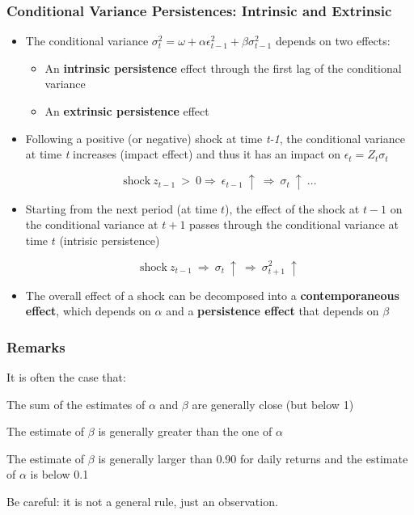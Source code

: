 \documentclass{beamer}
\newenvironment{wideitemize}{\itemize\addtolength{\itemsep}{10pt}}{\enditemize}
\newenvironment{wideenumerate}{\enumerate\addtolength{\itemsep}{10pt}}{\endenumerate}
\begin{document}
\begin{frame}
  \frametitle{Conditional Variance Persistences: Intrinsic and Extrinsic}
  \begin{itemize}
  \item The conditional variance $\sigma_t^2 = \omega + \alpha \epsilon^2_{t-1} + \beta \sigma^2_{t-1}$ depends on two effects:
    \begin{itemize}
    \item An \textbf{intrinsic persistence} effect through the first lag of the conditional variance
    \item An \textbf{extrinsic persistence} effect
    \end{itemize}
    
  \item Following a positive (or negative) shock at time \emph{t-1}, the conditional variance at time \emph{t} increases (impact effect) and thus it has an impact on $\epsilon_t = Z_t \sigma_t$

    \begin{equation*}
      \text{shock} \ z_{t-1} \ > \ 0 \Rightarrow \ \epsilon_{t-1} \ \uparrow \ \Rightarrow \ \sigma_t \ \uparrow \ \dots
    \end{equation*}

  \item Starting from the next period (at time $t$), the effect of the shock at $t-1$ on the conditional variance at $t+1$ passes through the conditional variance at time $t$ (intrisic persistence)

    \begin{equation*}
      \text{shock} \ z_{t-1} \ \Rightarrow \ \sigma_t \ \uparrow \ \Rightarrow \ \sigma^2_{t+1} \ \uparrow 
    \end{equation*}
\item The overall effect of a shock can be decomposed into a \textbf{contemporaneous effect}, which depends on $\alpha$ and a \textbf{persistence effect} that depends on $\beta$
    
  \end{itemize}
\end{frame}



\begin{frame}
  \frametitle{Remarks}

  \begin{wideitemize}
  \item It is often the case that:
      \begin{wideenumerate}
  \item The sum of the estimates of $\alpha$ and $\beta$ are generally close (but below 1)
  \item The estimate of $\beta$ is generally greater than the one of $\alpha$
  \item The estimate of $\beta$ is generally larger than 0.90 for daily returns and the estimate of $\alpha$ is below 0.1
  \end{wideenumerate}
  \item Be careful: it is not a general rule, just an observation.
  \end{wideitemize}  
\end{frame}
\end{document}
